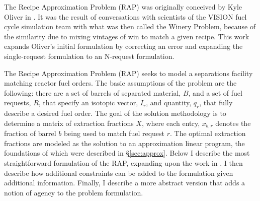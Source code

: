 The Recipe Approximation Problem (RAP) was originally conceived by Kyle Oliver
in \cite{oliver_geniusv2:_2009}. It was the result of conversations with
scientists of the VISION fuel cycle simulation team \cite{vision2009} with what
was then called the Winery Problem, because of the similarity due to mixing
vintages of win to match a given recipe. This work expands Oliver's initial
formulation by correcting an error and expanding the single-request formulation
to an N-request formulation.

The Recipe Approximation Problem (RAP) seeks to model a separations facility
matching reactor fuel orders. The basic assumptions of the problem are the
following: there are a set of barrels of separated material, $B$, and a set of
fuel requests, $R$, that specify an isotopic vector, $I_{r}$, and quantity,
$q_{r}$, that fully describe a desired fuel order. The goal of the solution
methodology is to determine a matrix of extraction fractions $X$, where each
entry, $x_{b,r}$ denotes the fraction of barrel $b$ being used to match fuel
request $r$. The optimal extraction fractions are modeled as the solution to an
approximation linear program, the foundations of which were described in
\S\ref{sec:approx}. Below I describe the most straightforward formulation of 
the RAP, expanding upon the work in \cite{oliver_geniusv2:_2009}. I then
describe how additional constraints can be added to the formulation given
additional information. Finally, I describe a more abstract version that adds a
notion of agency to the problem formulation.
